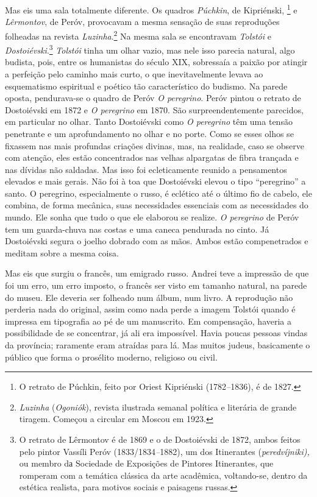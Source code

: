 Mas eis uma sala totalmente diferente. Os quadros \emph{Púchkin}, de
Kipriénski, \footnote{O retrato de Púchkin, feito por Oriest Kipriénski
  (1782\emph{--}1836), é de 1827.} e \emph{Lêrmontov}, de Peróv,
provocavam a mesma sensação de suas reproduções folheadas na revista
\emph{Luzinha}.\footnote{\emph{Luzinha} (\emph{Ogoniók}), revista
  ilustrada semanal política e literária de grande tiragem. Começou a
  circular em Moscou em 1923.} Na mesma sala se encontravam
\emph{Tolstói} e \emph{Dostoiévski}.\footnote{O retrato de Lêrmontov é
  de 1869 e o de Dostoiévski de 1872, ambos feitos pelo pintor Vassíli
  Peróv (1833/1834\emph{--}1882), um dos Itinerantes
  (\emph{peredvíjniki),} ou membro dа Sociedade de Exposições de
  Pintores Itinerantes, que romperam com a temática clássica da arte
  acadêmica, voltando-se, dentro da estética realista, para motivos
  sociais e paisagens russas.} \emph{Tolstói} tinha um olhar vazio, mas
nele isso parecia natural, algo budista, pois, entre os humanistas do
século XIX, sobressaía a paixão por atingir a perfeição pelo caminho
mais curto, o que inevitavelmente levava ao esquematismo espiritual e
poético tão característico do budismo. Na parede oposta, pendurava-se o
quadro de Peróv \emph{O peregrino}. Peróv pintou o retrato de
Dostoiévski em 1872 e \emph{O peregrino} em 1870. São surpreendentemente
parecidos, em particular no olhar. Tanto Dostoiévski como \emph{O
peregrino} têm uma tensão penetrante e um aprofundamento no olhar e no
porte. Como se esses olhos se fixassem nas mais profundas criações
divinas, mas, na realidade, caso se observe com atenção, eles estão
concentrados nas velhas alpargatas de fibra trançada e nas dívidas não
saldadas. Mas isso foi ecleticamente reunido a pensamentos elevados e
mais gerais. Não foi à toa que Dostoiévski elevou o tipo ``peregrino'' a
santo. O peregrino, especialmente o russo, é eclético até o último fio
de cabelo, ele combina, de forma mecânica, suas necessidades essenciais
com as necessidades do mundo. Ele sonha que tudo o que ele elaborou se
realize. \emph{O peregrino} de Peróv tem um guarda-chuva nas costas e
uma caneca pendurada no cinto. Já Dostoiévski segura o joelho dobrado
com as mãos. Ambos estão compenetrados e meditam sobre a mesma coisa.

Mas eis que surgiu o francês, um emigrado russo. Andrei teve a impressão
de que foi um erro, um erro imposto, o francês ser visto em tamanho
natural, na parede do museu. Ele deveria ser folheado num álbum, num
livro. A reprodução não perderia nada do original, assim como nada perde
a imagem Tolstói quando é impressa em tipografia ao pé de um manuscrito.
Em compensação, haveria a possibilidade de se concentrar, já ali era
impossível. Havia poucas pessoas vindas da província; raramente eram
atraídas para lá. Mas muitos judeus, basicamente o público que forma o
prosélito moderno, religioso ou civil.

